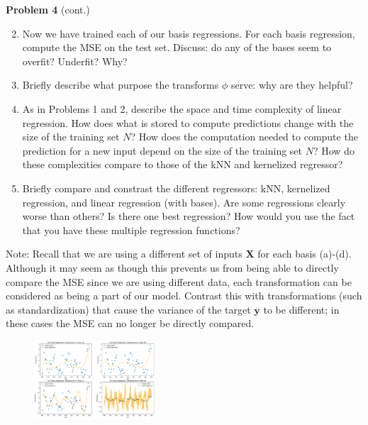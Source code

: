 \documentclass[submit]{harvardml}
\begin{document}
\newpage
\begin{framed}
\noindent\textbf{Problem 4} (cont.)\\
\begin{enumerate}
\setcounter{enumi}{1}
\item 
Now we have trained each of our basis regressions.  For each basis
regression, compute the MSE on the test set.  Discuss: do any of the
bases seem to overfit?  Underfit?  Why?



\item Briefly describe what purpose the transforms $\phi$ serve: why are they helpful?

\item As in Problems 1 and 2, describe the space and time complexity of linear regression.  How does what is stored to compute predictions change with the size of the training set $N$?  How does the computation needed to compute the prediction for a new input depend on the size of the training set $N$?  How do these complexities compare to those of the kNN and kernelized regressor?

\item Briefly compare and constrast the different regressors: kNN,
  kernelized regression, and linear regression (with bases).  Are some
  regressions clearly worse than others?  Is there one best
  regression?  How would you use the fact that you have these multiple
  regression functions?
  
\end{enumerate}
Note:
Recall that we are using a 
different set of inputs $\mathbf{X}$ for each basis (a)-(d). 
Although it may seem as though this prevents us from being able 
to directly compare the MSE since we are using different data, 
each transformation can be considered as being a part of our model. 
Contrast this with transformations (such as standardization) that cause the variance of the target $\mathbf{y}$ to be different; in these cases the
MSE can no longer be directly compared.

\end{framed}
\newpage
\begin{figure}
  \centering
  \includegraphics[width=0.4\textwidth]{Linear_bases.png}
\end{figure}
\end{document}
